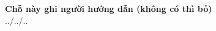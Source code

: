 \begin{titlepage}
\begin{center}
    \textbf{\textit{}}
\end{center}

\begin{center}
\fontsize{16pt}{20pt}\selectfont
\vspace{20pt}
\textbf{Chỗ này ghi người hướng dẫn (không có thì bỏ)}\\
\vspace{120pt}
../../..
\end{center}
\end{titlepage}